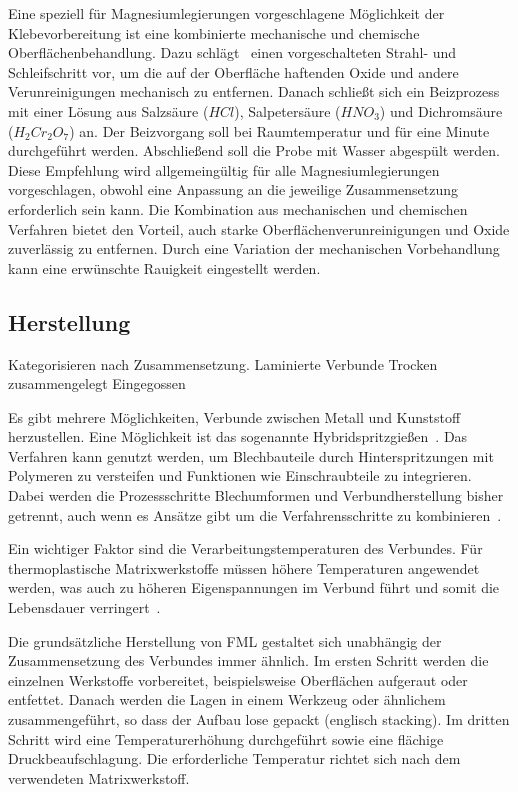 Eine speziell für Magnesiumlegierungen vorgeschlagene Möglichkeit der Klebevorbereitung ist eine kombinierte mechanische und chemische Oberflächenbehandlung.
Dazu schlägt~\cite{Bauer1991} einen vorgeschalteten Strahl- und Schleifschritt vor, um die auf der Oberfläche haftenden Oxide und andere Verunreinigungen mechanisch zu entfernen.
Danach schließt sich ein Beizprozess mit einer Lösung aus Salzsäure ($HCl$), Salpetersäure ($HNO_3$) und Dichromsäure ($H_{2}Cr_{2}O_{7}$) an.
Der Beizvorgang soll bei Raumtemperatur und für eine Minute durchgeführt werden.
Abschließend soll die Probe mit Wasser abgespült werden.
Diese Empfehlung wird allgemeingültig für alle Magnesiumlegierungen vorgeschlagen, obwohl eine Anpassung an die jeweilige Zusammensetzung erforderlich sein kann.
Die Kombination aus mechanischen und chemischen Verfahren bietet den Vorteil, auch starke Oberflächenverunreinigungen und Oxide zuverlässig zu entfernen.
Durch eine Variation der mechanischen Vorbehandlung kann eine erwünschte Rauigkeit eingestellt werden.

\subsection{Herstellung}\label{subsec:herstellung}

Kategorisieren nach Zusammensetzung.
Laminierte Verbunde
Trocken zusammengelegt
Eingegossen

Es gibt mehrere Möglichkeiten, Verbunde zwischen Metall und Kunststoff herzustellen.
Eine Möglichkeit ist das sogenannte Hybridspritzgießen~\cite{GeigerManfred2003}.
Das Verfahren kann genutzt werden, um Blechbauteile durch Hinterspritzungen mit Polymeren zu versteifen und Funktionen wie Einschraubteile zu integrieren.
Dabei werden die Prozessschritte Blechumformen und Verbundherstellung bisher getrennt, auch wenn es Ansätze gibt um die Verfahrensschritte zu kombinieren~\cite{Wiedemann2017}.

Ein wichtiger Faktor sind die Verarbeitungstemperaturen des Verbundes.
Für thermoplastische Matrixwerkstoffe müssen höhere Temperaturen angewendet werden, was auch zu höheren Eigenspannungen im Verbund führt und somit die Lebensdauer verringert~\cite{Alderliesten2008}.

Die grundsätzliche Herstellung von FML gestaltet sich unabhängig der Zusammensetzung des Verbundes immer ähnlich.
Im ersten Schritt werden die einzelnen Werkstoffe vorbereitet, beispielsweise Oberflächen aufgeraut oder entfettet.
Danach werden die Lagen in einem Werkzeug oder ähnlichem zusammengeführt, so dass der Aufbau lose gepackt (englisch \glqq stacking\grqq).
Im dritten Schritt wird eine Temperaturerhöhung durchgeführt sowie eine flächige Druckbeaufschlagung.
Die erforderliche Temperatur richtet sich nach dem verwendeten Matrixwerkstoff.

